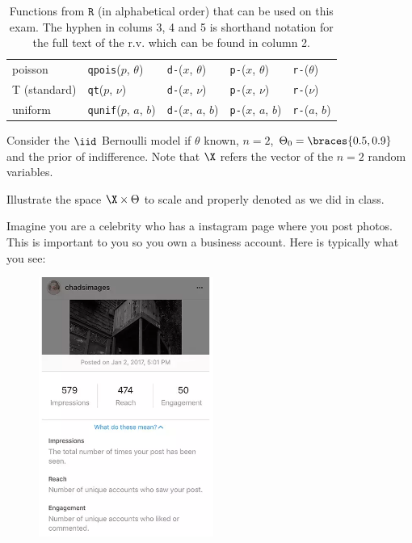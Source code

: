 \documentclass[12pt]{article}
\begin{document}
\begin{table}[htp]
\begin{tabular}{l | llll}

poisson & \texttt{qpois}($p$, $\theta$) 
& \texttt{d-}($x$, $\theta$)
& \texttt{p-}($x$, $\theta$) 
& \texttt{r-}($\theta$) \\

T (standard) & \texttt{qt}($p$, $\nu$) 
& \texttt{d-}($x$, $\nu$) 
& \texttt{p-}($x$, $\nu$)
& \texttt{r-}($\nu$) \\


uniform & \texttt{qunif}($p$, $a$, $b$) 
& \texttt{d-}($x$, $a$, $b$)
& \texttt{p-}($x$, $a$, $b$) 
& \texttt{r-}($a$, $b$) \\


\end{tabular}
\caption{Functions from $\texttt{R}$ (in alphabetical order) that can be used on this exam. The hyphen in colums 3, 4 and 5 is shorthand notation for the full text of the r.v. which can be found in column 2.
}
\label{tab:eqs}
\end{table}

\problem Consider the $\iid$ Bernoulli model if $\theta$ known, $n=2$, $\Theta_0 = \braces{0.5, 0.9}$ and the prior of indifference. Note that $\X$ refers the vector of the $n=2$ random variables.

\benum

 Illustrate the space $\mathcal{\X} \times \Theta$ to scale and properly denoted as we did in class. 


\eenum


\problem Imagine you are a celebrity who has a instagram page where you post photos. This is important to you so you own a business account. Here is typically what you see:

\begin{figure}[htp]
\centering
\includegraphics[width=2.25in]{instagram.png}
\end{figure}
\end{document}
